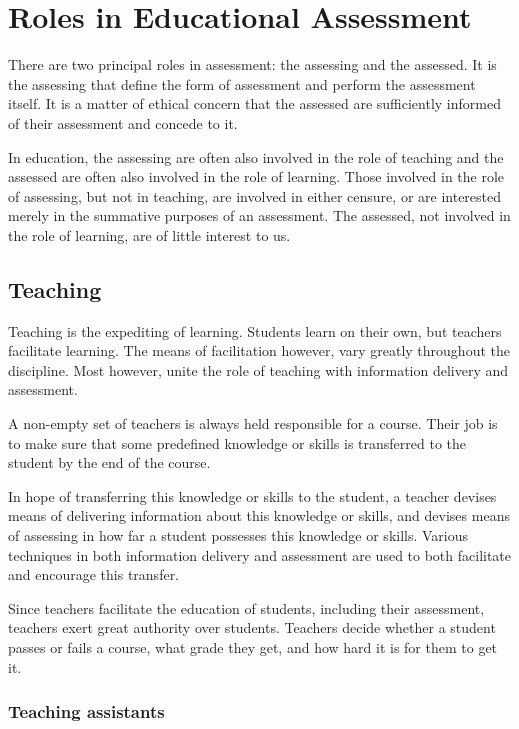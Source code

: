 
\section{Roles in Educational Assessment}

There are two principal roles in assessment: the assessing and the assessed.
It is the assessing that define the form of assessment and perform the
assessment itself. It is a matter of ethical concern that the assessed are
sufficiently informed of their assessment and concede to it.

In education, the assessing are often also involved in the role of teaching and
the assessed are often also involved in the role of learning. Those involved in
the role of assessing, but not in teaching, are involved in either censure, or
are interested merely in the summative purposes of an assessment. The assessed,
not involved in the role of learning, are of little interest to us.

\subsection{Teaching}

Teaching is the expediting of learning. Students learn on their own, but
teachers facilitate learning\cite{skinner-1965}. The means of facilitation
however, vary greatly throughout the discipline\cite{ramsden-1992,kember-1997}.
Most however, unite the role of teaching with information delivery and
assessment.

A non-empty set of teachers is always held responsible for a course. Their job
is to make sure that some predefined knowledge or skills is transferred to the
student by the end of the course.

In hope of transferring this knowledge or skills to the student, a teacher
devises means of delivering information about this knowledge or skills, and
devises means of assessing in how far a student possesses this knowledge or
skills. Various techniques in both information delivery and assessment are used
to both facilitate and encourage this transfer.

Since teachers facilitate the education of students, including their
assessment, teachers exert great authority over students. Teachers decide
whether a student passes or fails a course, what grade they get, and how hard
it is for them to get it.

\subsubsection{Teaching assistants}

